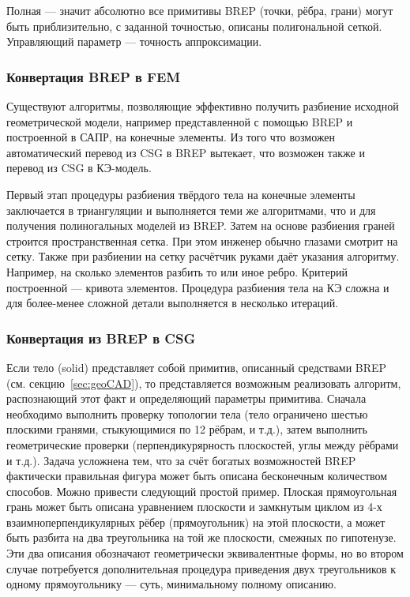 Полная --- значит абсолютно все примитивы BREP (точки, рёбра, грани) могут быть приблизительно, с заданной точностью, описаны полигональной сеткой. Управляющий параметр --- точность аппроксимации.

\subsubsection{Конвертация BREP в FEM}\label{sec:secBREPtoFEM}

Существуют алгоритмы, позволяющие эффективно получить разбиение исходной геометрической модели, например представленной с помощью BREP и построенной в САПР, на конечные элементы.
Из того что возможен автоматический перевод из CSG в BREP вытекает, что возможен также и перевод из CSG в КЭ-модель.

Первый этап процедуры разбиения твёрдого тела на конечные элементы заключается в триангуляции и выполняется теми же алгоритмами, что и для получения полиногальных моделей из BREP. Затем на основе разбиения граней строится пространственная сетка.
При этом инженер обычно глазами смотрит на сетку. Также при разбиении на сетку расчётчик руками даёт указания алгоритму. Например, на сколько элементов разбить то или иное ребро. Критерий построенной --- кривота элементов. Процедура разбиения тела на КЭ сложна и для более-менее сложной детали выполняется в несколько итераций. 

\subsubsection{Конвертация из BREP в CSG}\label{sec:secBREPtoCSG}

Если тело (solid) представляет собой примитив, описанный средствами BREP (см. секцию~\ref{sec:geoCAD}), то представляется возможным реализовать алгоритм, распознающий этот факт и определяющий параметры примитива. Сначала необходимо выполнить проверку топологии тела (тело ограничено шестью плоскими гранями, стыкующимися по 12 рёбрам, и т.д.), затем выполнить геометрические проверки (перпендикурярность плоскостей, углы между рёбрами и т.д.). Задача усложнена тем, что за счёт богатых возможностей BREP фактически правильная фигура может быть описана бесконечным количеством способов. Можно привести следующий простой пример. Плоская прямоугольная грань может быть описана уравнением плоскости и замкнутым циклом из 4-х взаимноперпендикулярных рёбер (прямоугольник) на этой плоскости, а может быть разбита на два треугольника на той же плоскости, смежных по гипотенузе. Эти два описания обозначают геометрически эквивалентные формы, но во втором случае потребуется дополнительная процедура приведения двух треугольников к одному прямоугольнику --- суть, минимальному полному описанию.

